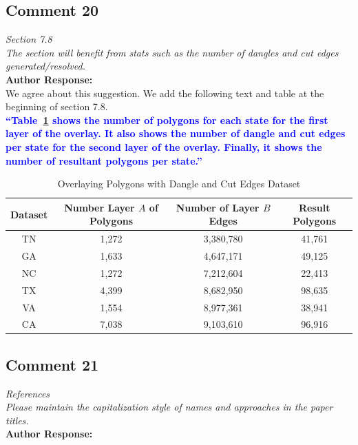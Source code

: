 \documentclass[10pt]{article}
\newcounter{tablemajor}
\newcommand*\settablecounter[1]{%
        \setcounter{tablemajor}{#1}%
}
\begin{document}
\subsection*{Comment 20}
\textit{
Section 7.8\\
The section will benefit from stats such as the number of dangles and cut edges generated/resolved.
} \\

\textbf{Author Response:}\\

We agree about this suggestion.  We add the following text and table at the beginning of section 7.8.\\

\textcolor{blue}{\textbf{
``Table~\ref{tab:dangles} shows the number of polygons for each state for the first layer of the overlay. It also shows the number of dangle and cut edges per state for the second layer of the overlay. Finally, it shows the number of resultant polygons per state.''
}}

\settablecounter{8}
\begin{table}[h!]
    \caption{Overlaying Polygons with Dangle and Cut Edges Dataset}
    \label{tab:dangles}
    \begin{tabular}{c c c c}
        \hline
        Dataset & Number Layer $A$ of Polygons & Number of Layer $B$ Edges & Result Polygons \\
        \hline
        TN & 1,272 & 3,380,780 & 41,761 \\
        GA & 1,633 & 4,647,171 & 49,125 \\
        NC & 1,272 & 7,212,604 & 22,413 \\
        TX & 4,399  & 8,682,950 & 98,635 \\
        VA & 1,554 & 8,977,361 & 38,941 \\
        CA & 7,038 & 9,103,610 & 96,916\\
        \hline
    \end{tabular}
\end{table}

\subsection*{Comment 21}
\textit{
References\\
Please maintain the capitalization style of names and approaches in the paper titles.
} \\

\textbf{Author Response:}\\
\end{document}
